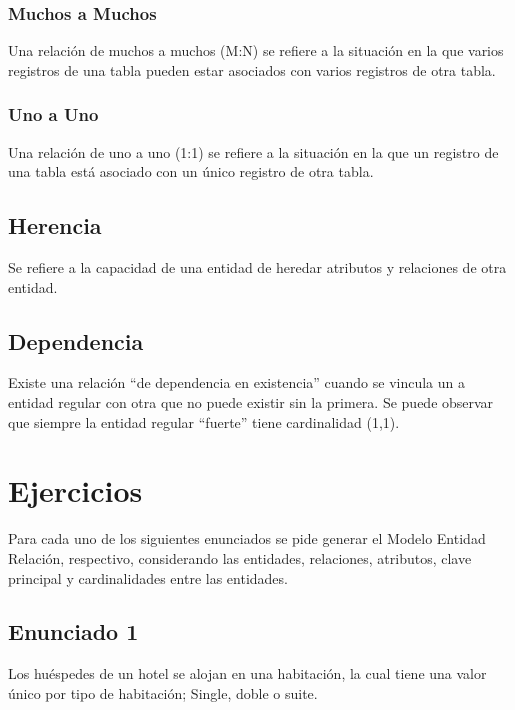\documentclass{templateNote}
\begin{document}

\subsubsection{Muchos a Muchos}
\indent
Una relación de muchos a muchos (M:N) se refiere a la situación en la que varios 
registros de una tabla pueden estar asociados con varios registros de otra tabla. 


\subsubsection{Uno a Uno}
\indent
Una relación de uno a uno (1:1) se refiere a la situación en la que un registro
de una tabla está asociado con un único registro de otra tabla.


\newpage
\subsection{Herencia}
\indent
Se refiere a la capacidad de una entidad de heredar atributos y relaciones de otra entidad. 


\subsection{Dependencia}
\indent
Existe una relación “de dependencia en existencia” cuando se vincula un a entidad
regular con otra que no puede existir sin la primera. Se puede observar que
siempre la entidad regular “fuerte” tiene cardinalidad (1,1).

\section{Ejercicios}
\indent
Para cada uno de los siguientes enunciados se pide generar el Modelo Entidad Relación, respectivo,
considerando las entidades, relaciones, atributos, clave principal y cardinalidades entre las entidades.

\subsection{Enunciado 1}
\indent
Los huéspedes de un hotel se alojan en una habitación, la cual tiene una valor único por tipo de
habitación; Single, doble o suite.
\end{document}
